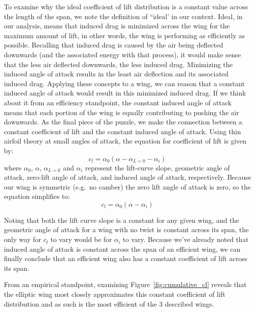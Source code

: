 \documentclass{article}
\begin{document}
To examine why the ideal coefficient of lift distribution is a constant value across the length of the span, we note the definition of ``ideal' in our context. Ideal, in our analysis, means that induced drag is minimized across the wing for the maximum amount of lift, in other words, the wing is performing as efficiently as possible. Recalling that induced drag is caused by the air being deflected downwards (and the associated energy with that process), it would make sense that the less air deflected downwards, the less induced drag.
Minimizing the induced angle of attack results in the least air deflection and its associated induced drag. Applying these concepts to a wing, we can reason that a constant induced angle of attack would result in this minimized induced drag. If we think about it from an efficiency standpoint, the constant induced angle of attack means that each portion of the wing is equally contributing to pushing the air downwards. As the final piece of the puzzle, we make the connection between a constant coefficient of lift and the constant induced angle of attack.
Using thin airfoil theory at small angles of attack, the equation for coefficient of lift is given by:
\begin{equation}\label{eq:coefficient_of_lift}
c_l = \alpha_0(\alpha - \alpha_{L=0} -\alpha_i)
\end{equation}
where $\alpha_0$, $\alpha$, $\alpha_{L=0}$ and $\alpha_i$ represent the lift-curve slope, geometric angle of attack, zero-lift angle of attack, and induced angle of attack, respectively. 
Because our wing is symmetric (e.g.\ no camber) the zero lift angle of attack is zero, so the equation simplifies to:
\begin{equation}\label{eq:coefficient_of_lift_final}
c_l = \alpha_0(\alpha -\alpha_i)
\end{equation}

Noting that both the lift curve slope is a constant for any given wing, and the geometric angle of attack for a wing with no twist is constant across its span, the only way for $c_l$ to vary would be for $\alpha_i$ to vary. Because we've already noted that induced angle of attack is constant across the span of an efficient wing, we can finally conclude that an efficient wing also has a constant coefficient of lift across its span.

From an empirical standpoint, examining Figure~\ref{fig:cumulative_cl} reveals that the elliptic wing most closely approximates this constant coefficient of lift distribution and as such is the most efficient of the 3 described wings.
\end{document}
